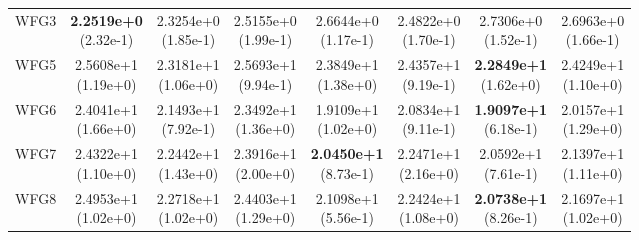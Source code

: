 \begin{table}[p]
\begin{tabular}{lccccccc}
WFG3 & \shortstack{\textbf{2.2519e+0}\\(2.32e-1)} & \shortstack{2.3254e+0\\(1.85e-1)} & \shortstack{2.5155e+0\\(1.99e-1)} & \shortstack{2.6644e+0\\(1.17e-1)} & \shortstack{2.4822e+0\\(1.70e-1)} & \shortstack{2.7306e+0\\(1.52e-1)} & \shortstack{2.6963e+0\\(1.66e-1)} \\
WFG5 & \shortstack{2.5608e+1\\(1.19e+0)} & \shortstack{2.3181e+1\\(1.06e+0)} & \shortstack{2.5693e+1\\(9.94e-1)} & \shortstack{2.3849e+1\\(1.38e+0)} & \shortstack{2.4357e+1\\(9.19e-1)} & \shortstack{\textbf{2.2849e+1}\\(1.62e+0)} & \shortstack{2.4249e+1\\(1.10e+0)} \\
WFG6 & \shortstack{2.4041e+1\\(1.66e+0)} & \shortstack{2.1493e+1\\(7.92e-1)} & \shortstack{2.3492e+1\\(1.36e+0)} & \shortstack{1.9109e+1\\(1.02e+0)} & \shortstack{2.0834e+1\\(9.11e-1)} & \shortstack{\textbf{1.9097e+1}\\(6.18e-1)} & \shortstack{2.0157e+1\\(1.29e+0)} \\
WFG7 & \shortstack{2.4322e+1\\(1.10e+0)} & \shortstack{2.2442e+1\\(1.43e+0)} & \shortstack{2.3916e+1\\(2.00e+0)} & \shortstack{\textbf{2.0450e+1}\\(8.73e-1)} & \shortstack{2.2471e+1\\(2.16e+0)} & \shortstack{2.0592e+1\\(7.61e-1)} & \shortstack{2.1397e+1\\(1.11e+0)} \\
WFG8 & \shortstack{2.4953e+1\\(1.02e+0)} & \shortstack{2.2718e+1\\(1.02e+0)} & \shortstack{2.4403e+1\\(1.29e+0)} & \shortstack{2.1098e+1\\(5.56e-1)} & \shortstack{2.2424e+1\\(1.08e+0)} & \shortstack{\textbf{2.0738e+1}\\(8.26e-1)} & \shortstack{2.1697e+1\\(1.02e+0)} \\

\end{tabular}
\end{table}
